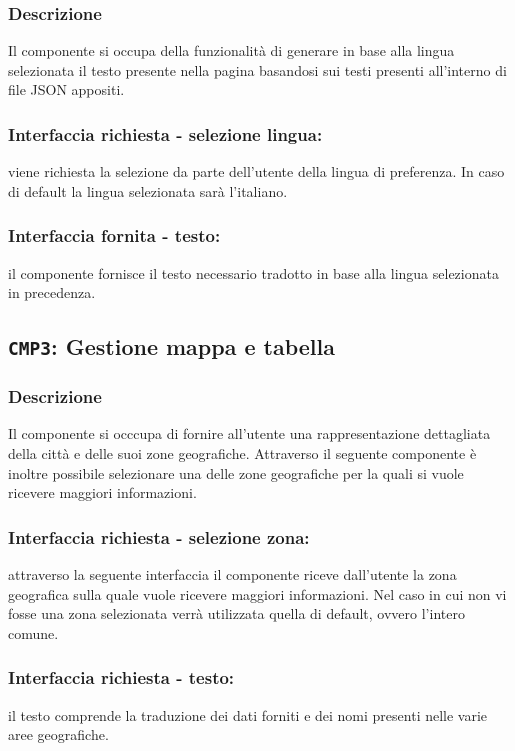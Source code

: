         \subsubsection{Descrizione} 
            Il componente si occupa della funzionalità di generare in base alla lingua selezionata il testo presente nella pagina basandosi sui testi presenti all'interno di file JSON appositi.
        \subsubsection{Interfaccia richiesta - selezione lingua:}
            viene richiesta la selezione da parte dell'utente della lingua di preferenza.
            In caso di default la lingua selezionata sarà l'italiano.
        \subsubsection{Interfaccia fornita - testo:}
            il componente fornisce il testo necessario tradotto in base alla lingua selezionata in precedenza.

    \subsection{\texttt{CMP3}: Gestione mappa e tabella}
        \subsubsection{Descrizione}
            Il componente si occcupa di fornire all'utente una rappresentazione dettagliata della città e delle suoi zone geografiche. Attraverso il seguente componente è inoltre possibile selezionare una delle zone geografiche per la quali si vuole ricevere maggiori informazioni. 
        \subsubsection{Interfaccia richiesta - selezione zona:}
            attraverso la seguente interfaccia il componente riceve dall'utente la zona geografica sulla quale vuole ricevere maggiori informazioni. Nel caso in cui non vi fosse una zona selezionata verrà utilizzata quella di default, ovvero l'intero comune.
        \subsubsection{Interfaccia richiesta - testo:}
            il testo comprende la traduzione dei dati forniti e dei nomi presenti nelle varie aree geografiche.
